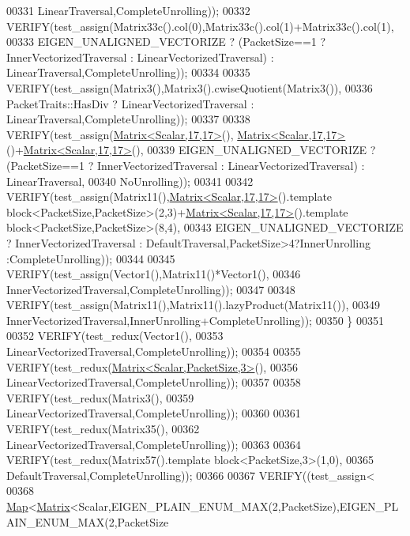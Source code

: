 \begin{DoxyCode}
00331         LinearTraversal,CompleteUnrolling));
00332       VERIFY(test\_assign(Matrix33c().col(0),Matrix33c().col(1)+Matrix33c().col(1),
00333         EIGEN\_UNALIGNED\_VECTORIZE ? (PacketSize==1 ? InnerVectorizedTraversal : LinearVectorizedTraversal) 
      : LinearTraversal,CompleteUnrolling));
00334               
00335       VERIFY(test\_assign(Matrix3(),Matrix3().cwiseQuotient(Matrix3()),
00336         PacketTraits::HasDiv ? LinearVectorizedTraversal : LinearTraversal,CompleteUnrolling));
00337         
00338       VERIFY(test\_assign(\hyperlink{group___core___module_class_eigen_1_1_matrix}{Matrix<Scalar,17,17>}(),
      \hyperlink{group___core___module_class_eigen_1_1_matrix}{Matrix<Scalar,17,17>}()+\hyperlink{group___core___module_class_eigen_1_1_matrix}{Matrix<Scalar,17,17>}(),
00339         EIGEN\_UNALIGNED\_VECTORIZE ? (PacketSize==1 ? InnerVectorizedTraversal : LinearVectorizedTraversal) 
      : LinearTraversal,
00340         NoUnrolling));
00341         
00342       VERIFY(test\_assign(Matrix11(),\hyperlink{group___core___module_class_eigen_1_1_matrix}{Matrix<Scalar,17,17>}().\textcolor{keyword}{template} 
      block<PacketSize,PacketSize>(2,3)+\hyperlink{group___core___module_class_eigen_1_1_matrix}{Matrix<Scalar,17,17>}().\textcolor{keyword}{template} block<PacketSize,PacketSize>(8,4),
00343         EIGEN\_UNALIGNED\_VECTORIZE ? InnerVectorizedTraversal : DefaultTraversal,PacketSize>4?InnerUnrolling
      :CompleteUnrolling));
00344 
00345       VERIFY(test\_assign(Vector1(),Matrix11()*Vector1(),
00346                          InnerVectorizedTraversal,CompleteUnrolling));
00347 
00348       VERIFY(test\_assign(Matrix11(),Matrix11().lazyProduct(Matrix11()),
00349                          InnerVectorizedTraversal,InnerUnrolling+CompleteUnrolling));
00350     \}
00351     
00352     VERIFY(test\_redux(Vector1(),
00353       LinearVectorizedTraversal,CompleteUnrolling));
00354 
00355     VERIFY(test\_redux(\hyperlink{group___core___module_class_eigen_1_1_matrix}{Matrix<Scalar,PacketSize,3>}(),
00356       LinearVectorizedTraversal,CompleteUnrolling));
00357 
00358     VERIFY(test\_redux(Matrix3(),
00359       LinearVectorizedTraversal,CompleteUnrolling));
00360 
00361     VERIFY(test\_redux(Matrix35(),
00362       LinearVectorizedTraversal,CompleteUnrolling));
00363 
00364     VERIFY(test\_redux(Matrix57().\textcolor{keyword}{template} block<PacketSize,3>(1,0),
00365       DefaultTraversal,CompleteUnrolling));
00366 
00367     VERIFY((test\_assign<
00368             \hyperlink{group___core___module_class_eigen_1_1_map}{Map}<\hyperlink{group___core___module_class_eigen_1_1_matrix}{Matrix}<Scalar,EIGEN\_PLAIN\_ENUM\_MAX(2,PacketSize),EIGEN\_PLAIN\_ENUM\_MAX(2,PacketSize

\end{DoxyCode}
